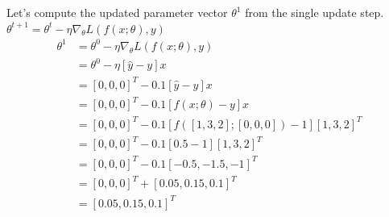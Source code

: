 \documentclass[a4paper]{article}
\theoremstyle{definition}
\newenvironment{soln}{
    \leavevmode\color{blue}\ignorespaces
}{}
\begin{document}
\begin{enumerate}
\begin{enumerate}
\begin{soln}
		Let's compute the updated parameter vector $\theta^{1}$ from the single update step. $\theta^{t+1} = \theta^{t} - \eta \nabla_{\theta} L(f(x;\theta), y)$
		\begin{align*}
			\theta^{1} &= \theta^{0} - \eta \nabla_{\theta} L(f(x;\theta), y) \\
			&= \theta^{0} - \eta [\hat{y} - y]x \\
			&= [0, 0, 0]^T - 0.1 [\hat{y} - y]x \\
			&= [0, 0, 0]^T - 0.1 [f(x;\theta) - y]x \\
			&= [0, 0, 0]^T - 0.1 [f([1, 3, 2];[0, 0, 0]) - 1][1, 3, 2]^T \\
			&= [0, 0, 0]^T - 0.1 [0.5 - 1][1, 3, 2]^T \\
			&= [0, 0, 0]^T - 0.1 [-0.5, -1.5, -1]^T \\
			&= [0, 0, 0]^T + [0.05, 0.15, 0.1]^T \\
			&= [0.05, 0.15, 0.1]^T \\
		\end{align*}
	\end{soln}
\end{enumerate}
\end{enumerate}
\end{document}
